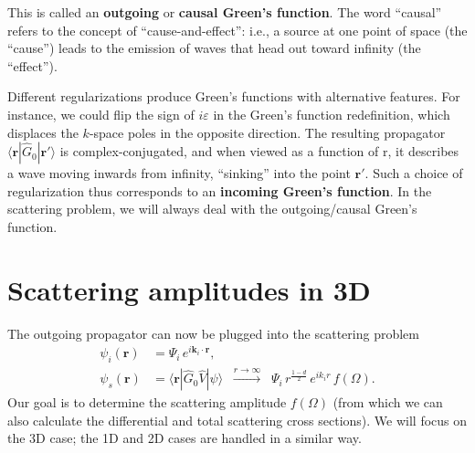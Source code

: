 \documentclass[pra,11pt]{revtex4}
\begin{document}
This is called an \textbf{outgoing} or \textbf{causal Green's
  function}.  The word ``causal'' refers to the concept of
``cause-and-effect'': i.e., a source at one point of space (the
``cause'') leads to the emission of waves that head out toward
infinity (the ``effect'').

Different regularizations produce Green's functions with alternative
features.  For instance, we could flip the sign of $i\varepsilon$ in
the Green's function redefinition, which displaces the $k$-space poles
in the opposite direction.  The resulting propagator
$\langle\mathbf{r}|\hat{G}_0|\mathbf{r}'\rangle$ is
complex-conjugated, and when viewed as a function of $\mathrm{r}$, it
describes a wave moving inwards from infinity, ``sinking'' into the
point $\mathbf{r}'$.  Such a choice of regularization thus corresponds
to an \textbf{incoming Green's function}.  In the scattering problem,
we will always deal with the outgoing/causal Green's function.

\section{Scattering amplitudes in 3D}

The outgoing propagator can now be plugged into the scattering problem
$$\begin{aligned} \psi_i(\mathbf{r}) &= \Psi_i \, e^{i\mathbf{k}_i\cdot\mathbf{r}}, \\ \psi_s(\mathbf{r}) &= \langle\mathbf{r}| \hat{G}_0 \hat{V} |\psi\rangle \;\; \overset{r\rightarrow\infty}{\longrightarrow}\;\; \Psi_i \, r^{\frac{1-d}{2}} \, e^{ik_ir} \, f(\Omega).
\end{aligned}$$
Our goal is to determine the scattering amplitude $f(\Omega)$ (from
which we can also calculate the differential and total scattering
cross sections).  We will focus on the 3D case; the 1D and 2D cases
are handled in a similar way.
\end{document}

